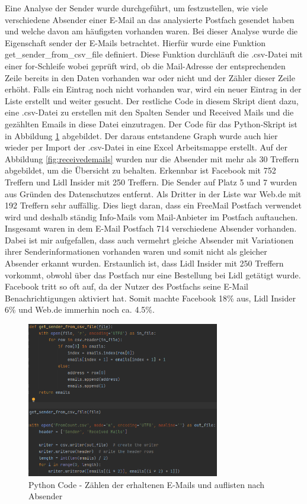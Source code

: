 Eine Analyse der Sender wurde durchgeführt, um festzustellen, wie viele verschiedene Absender einer E-Mail an das analysierte Postfach gesendet haben und welche davon am häufigsten vorhanden waren. Bei dieser Analyse wurde die Eigenschaft \glqq{}sender\grqq{} der E-Mails betrachtet. Hierfür wurde eine Funktion \glqq{}get\_sender\_from\_csv\_file\grqq{} definiert. Diese Funktion durchläuft die .csv-Datei mit einer for-Schleife wobei geprüft wird, ob die Mail-Adresse der entsprechenden Zeile bereits in den Daten vorhanden war oder nicht und der Zähler dieser Zeile erhöht. Falls ein Eintrag noch nicht vorhanden war, wird ein neuer Eintrag in der Liste erstellt und weiter gesucht. Der restliche Code in diesem Skript dient dazu, eine .csv-Datei zu erstellen mit den Spalten \glqq{}Sender\grqq{} und \glqq{}Received Mails\grqq{} und die gezählten Emails in diese Datei einzutragen. Der Code für das Python-Skript ist in Abbildung \ref{fig:countemailssender} abgebildet. Der daraus entstandene Graph wurde auch hier wieder per Import der .csv-Datei in eine Excel Arbeitsmappe erstellt. Auf der Abbildung \ref{fig:receivedemails} wurden nur die Absender mit mehr als 30 Treffern abgebildet, um die Übersicht zu behalten. Erkennbar ist Facebook mit 752 Treffern und Lidl Insider mit 250 Treffern. Die Sender auf Platz 5 und 7 wurden aus Gründen des Datenschutzes entfernt. Als Dritter in der Liste war Web.de mit 192 Treffern sehr auffällig. Dies liegt daran, dass ein FreeMail Postfach verwendet wird und deshalb ständig \glqq{}Info-Mails\grqq{} vom Mail-Anbieter im Postfach auftauchen. Insgesamt waren in dem E-Mail Postfach 714 verschiedene Absender vorhanden. Dabei ist mir aufgefallen, dass auch vermehrt gleiche Absender mit Variationen ihrer Senderinformationen vorhanden waren und somit nicht als gleicher Absender erkannt wurden. Erstaunlich ist, dass Lidl Insider mit 250 Treffern vorkommt, obwohl über das Postfach nur eine Bestellung bei Lidl getätigt wurde. Facebook tritt so oft auf, da der Nutzer des Postfachs seine E-Mail Benachrichtigungen aktiviert hat. Somit machte Facebook 18\% aus, Lidl Insider 6\% und Web.de immerhin noch ca. 4.5\%. 

\begin{figure}
    \centering
    \includegraphics[width=0.75\textwidth]{images/Count_Received_Mails_Count_Sender.PNG}
    \caption{Python Code - Zählen der erhaltenen E-Mails und auflisten nach Absender} 
    \label{fig:countemailssender}
\end{figure}

